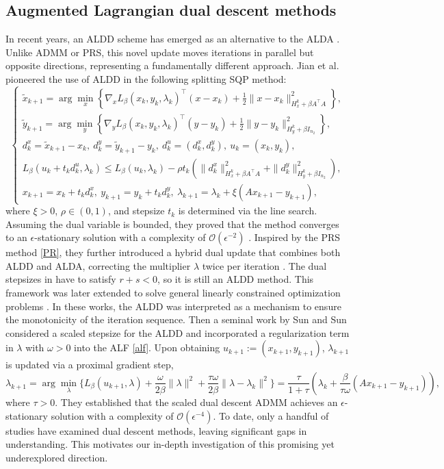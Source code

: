 \documentclass[pdflatex,sn-mathphys-num]{sn-jnl}%
\theoremstyle{thmstyleone}%
\theoremstyle{thmstyletwo}%
\theoremstyle{thmstylethree}%
\begin{document}
\subsection{Augmented Lagrangian dual descent methods}
In recent years, an ALDD scheme has emerged as an alternative to the ALDA \cite{JZY20,JLY21,JZY22,JCT23,JMX24,SS24}. Unlike ADMM or PRS, this novel update moves iterations in parallel but opposite directions, representing a fundamentally different approach. 
Jian et al. \cite{JZY20,JLY21,JZY22,JCT23,JMX24} pioneered the use of ALDD in the following splitting SQP method:
	\[\left\{\begin{array}{l}
		\tilde{x}_{k+1}=\arg\min\limits_{x} \left\{\nabla_x L_{\beta}(x_k,y_k,\lambda_k)^\top (x-x_k)+\frac{1}{2}\|x-x_k\|^2_{H_x^k+\beta A^\top A}\right\},\\
		\tilde{y}_{k+1}=\arg\min\limits_{y} \left\{\nabla_y L_{\beta}(x_k,y_k,\lambda_k)^\top (y-y_k)+\frac{1}{2}\|y-y_k\|^2_{H_y^k+\beta I_{n_2}}\right\},\\
		d^x_k=\tilde{x}_{k+1}-x_k,~d^y_k=\tilde{y}_{k+1}-y_k,~d^u_k=(d^x_k,d^y_k),~u_k=(x_k,y_k),\\
		L_{\beta}(u_k+t_kd^u_k,\lambda_k)\leq L_{\beta}(u_k,\lambda_k)-\rho t_k (\|d^x_k\|^2_{H_x^k+\beta A^\top A}+\|d^y_k\|^2_{H_y^k+\beta I_{n_2}}),\\
		x_{k+1}=x_k+t_k d^x_k,~y_{k+1}=y_k+t_k d^y_k,~\lambda_{k+1}=\lambda_{k}+\xi(Ax_{k+1}-y_{k+1}),
	\end{array}\right.\]
where $\xi>0$, $\rho\in (0, 1)$, and stepsize $t_k$ is determined via the line search. 
Assuming the dual variable is bounded, they proved that the method converges to an $\epsilon$-stationary solution with a complexity of $\mathcal{O} (\epsilon^{-2})$ \cite{JZY20,JLY21}. Inspired by the PRS method \eqref{PR}, they further introduced a hybrid dual update that combines both ALDD and ALDA, correcting the multiplier $\lambda$ twice per iteration \cite{JZY22}. The dual stepsizes in \cite{JZY22} have to satisfy $r+s<0$, so it is still an ALDD method. This framework was later extended to solve general linearly constrained optimization problems \cite{JCT23,JMX24}. In these works, the ALDD was interpreted as a mechanism to ensure the monotonicity of the iteration sequence.
Then a seminal work by Sun and Sun \cite{SS24} considered a scaled stepsize for the ALDD and incorporated a regularization term in $\lambda$ with $\omega>0$ into the ALF \eqref{alf}.
Upon obtaining $u_{k+1}:=(x_{k+1},y_{k+1})$, $\lambda_{k+1}$ is updated via a proximal gradient step,
\[\lambda_{k+1}=\arg\min_\lambda \{L_{\beta}(u_{k+1},\lambda)+\frac{\omega}{2\beta}\|\lambda\|^2+\frac{\tau\omega}{2\beta}\|\lambda-\lambda_k\|^2\}
=\frac{\tau}{1+\tau}(\lambda_k+\frac{\beta}{\tau\omega}(Ax_{k+1}-y_{k+1})),\]
where $\tau>0$. They established that the scaled dual descent ADMM achieves an $\epsilon$-stationary solution with a complexity of $\mathcal{O} (\epsilon^{-4})$. 
To date, only a handful of studies have examined dual descent methods, leaving significant gaps in understanding. This motivates our in-depth investigation of this promising yet underexplored direction.
\end{document}
